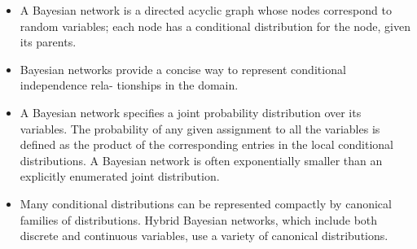 \documentclass[smaller]{article}
\begin{document}
\begin{itemize}
\item A Bayesian network is a directed acyclic graph whose nodes correspond to random variables; each node has a conditional distribution for the node, given its parents.

\item Bayesian networks provide a concise way to represent conditional independence rela- tionships in the domain.

\item A Bayesian network specifies a joint probability distribution over its variables. The probability of any given assignment to all the variables is defined as the product of the corresponding entries in the local conditional distributions. A Bayesian network is often exponentially smaller than an explicitly enumerated joint distribution.

\item Many conditional distributions can be represented compactly by canonical families of distributions. Hybrid Bayesian networks, which include both discrete and continuous variables, use a variety of canonical distributions.
\end{itemize}
\end{document}
